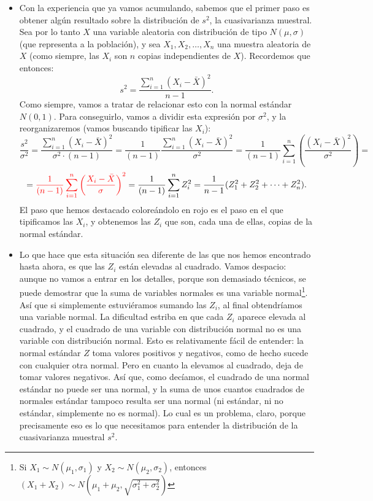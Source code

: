 \begin{itemize}
    \item Con la experiencia que ya vamos acumulando, sabemos que el primer paso es obtener algún resultado sobre la distribución de $s^2$, la cuasivarianza muestral. Sea por lo tanto $X$ una variable aleatoria con distribución de tipo $N(\mu,\sigma)$ (que representa a la población), y sea $X_1,X_2,\ldots,X_n$ una muestra aleatoria de $X$ (como siempre, las $X_i$ son $n$ copias independientes de $X$).  Recordemos que entonces:
        \[s^2=\dfrac{\displaystyle\sum_{i=1}^n(X_i-\bar X)^2}{{n-1}}.\]
        Como siempre, vamos a tratar de relacionar esto con la normal estándar $N(0,1)$. Para conseguirlo, vamos a dividir esta expresión por $\sigma^2$, y la reorganizaremos (vamos buscando tipificar las $X_i$):
        \begin{equation}\label{eq:ObtenerDistribucionCuasivarianzaMuestral}
        \dfrac{s^2}{\sigma^2}=\dfrac{\displaystyle\sum_{i=1}^n(X_i-\bar X)^2}{\sigma^2\cdot(n-1)}=
        \dfrac{1}{(n-1)}\dfrac{\displaystyle\sum_{i=1}^n(X_i-\bar X)^2}{\sigma^2}=\dfrac{1}{(n-1)}\sum_{i=1}^n\left(\dfrac{(X_i-\bar X)^2}{\sigma^2}\right)=
        \end{equation}
        \[
        =\textcolor{red}{\dfrac{1}{(n-1)}\sum_{i=1}^n\left(\dfrac{X_i-\bar X}{\sigma}\right)^2}=\dfrac{1}{(n-1)}\sum_{i=1}^n Z_i^2=\dfrac{1}{n-1}(Z_1^2+Z_2^2+\cdots+Z_n^2).\]
        El paso que hemos destacado coloreándolo en rojo es el paso en el que tipificamos las $X_i$, y obtenemos las $Z_i$ que son, cada una de ellas, copias de la normal estándar.

    \item Lo que hace que esta situación sea diferente de las que nos hemos encontrado hasta ahora, es que las $Z_i$ están elevadas al cuadrado. Vamos despacio: aunque no vamos a entrar en los detalles, porque son demasiado técnicos, se puede demostrar que la suma de variables normales es una variable normal\footnote{Si $X_1\sim N(\mu_1,\sigma_1)$ y $X_2\sim N(\mu_2,\sigma_2)$, entonces $(X_1+X_2)\sim N\left(\mu_1+\mu_2,\sqrt{\sigma_1^2+\sigma_2^2}\right)$ }. Así que si simplemente estuviéramos sumando las $Z_i$, al final obtendríamos una variable normal. La dificultad estriba en que cada $Z_i$ aparece elevada al cuadrado, {\sf y el cuadrado de una variable con distribución normal no es una variable con distribución normal}. Esto es relativamente fácil de entender: la normal estándar $Z$ toma valores positivos y negativos, como de hecho sucede con cualquier otra normal. Pero en cuanto la elevamos al cuadrado, deja de tomar valores negativos. Así que, como decíamos, el cuadrado de una normal estándar no puede ser una normal, y la suma de unos cuantos cuadrados de normales estándar tampoco resulta ser una normal (ni estándar, ni no estándar, simplemente no es normal). Lo cual es un problema, claro, porque precisamente eso es lo que necesitamos para entender la distribución de la cuasivarianza muestral $s^2$.


\end{itemize}
